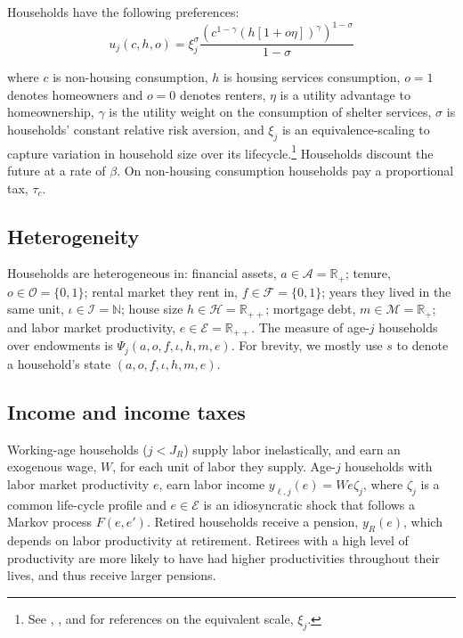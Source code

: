\documentclass[parskip=full]{article}
\begin{document}
Households have the following preferences:
\begin{equation*}
    u_{j}(c,h,o)=\xi_{j}^{\sigma}\frac{\left(c^{1-\gamma} \left(h[1+o\eta]\right)^{\gamma}\right)^{1-\sigma}}{1-\sigma}
\end{equation*}


\noindent where $c$ is non-housing consumption, $h$ is housing services consumption, $o=1$ denotes homeowners and $o=0$ denotes renters, $\eta$ is a utility advantage to homeownership, $\gamma$ is the utility weight on the consumption of shelter services, $\sigma$ is households' constant relative risk aversion, and $\xi_{j}$ is an equivalence-scaling to capture variation in household size over its lifecycle.\footnote{See \citet{lm-1980}, \citet{wz-2010}, and \citet{xu-2013} for references on the equivalent scale, $\xi_{j}$.} Households discount the future at a rate of $\beta$. On non-housing consumption households pay a proportional tax, $\tau_{c}$.

\subsection{Heterogeneity}

Households are heterogeneous in: financial assets, $a\in \mathcal{A}=\mathbb{R}_+$; tenure, $o \in \mathcal{O}=\{0,1\}$; rental market they rent in, $f \in \mathcal{F}=\{0,1\}$; years they lived in the same unit, $\iota \in \mathcal{I}=\mathbb{N}$; house size $h\in \mathcal{H}=\mathbb{R}_{++}$; mortgage debt, $m\in \mathcal{M}=\mathbb{R}_+$; and labor market productivity, $e \in\mathcal{E} = \mathbb{R}_{++}$. The measure of age-$j$ households over endowments is $\Psi_{j}(a,o,f,\iota,h,m,e)$. For brevity, we mostly use $s$ to denote a household's state $(a,o,f,\iota,h,m,e)$.

\subsection{Income and income taxes}\label{subsection:income}

Working-age households ($j<J_{R}$) supply labor inelastically, and earn an exogenous wage, $W$, for each unit of labor they supply. Age-$j$ households with labor market productivity $e$, earn labor income $y_{\ell,j}(e)=We\zeta_j$, where $\zeta_j$ is a common life-cycle profile and $e\in \mathcal{E}$ is an idiosyncratic shock that follows a Markov process $F(e,e')$. Retired households receive a pension, $y_{R}(e)$, which depends on labor productivity at retirement. Retirees with a high level of productivity are more likely to have had higher productivities throughout their lives, and thus receive larger pensions. 
\end{document}
